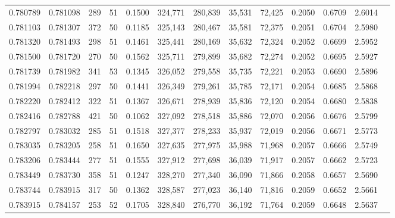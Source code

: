 \begin{tabular}{rrrrrrrrrrrrr}
0.780789 & 0.781098 &   289 &  51 &                                     0.1500 & 324,771 & 280,839 &  35,531 &  72,425 & 0.2050 & 0.6709 & 2.6014 \\
0.781103 & 0.781307 &   372 &  50 &                                     0.1185 & 325,143 & 280,467 &  35,581 &  72,375 & 0.2051 & 0.6704 & 2.5980 \\
0.781320 & 0.781493 &   298 &  51 &                                     0.1461 & 325,441 & 280,169 &  35,632 &  72,324 & 0.2052 & 0.6699 & 2.5952 \\
0.781500 & 0.781720 &   270 &  50 &                                     0.1562 & 325,711 & 279,899 &  35,682 &  72,274 & 0.2052 & 0.6695 & 2.5927 \\
0.781739 & 0.781982 &   341 &  53 &                                     0.1345 & 326,052 & 279,558 &  35,735 &  72,221 & 0.2053 & 0.6690 & 2.5896 \\
0.781994 & 0.782218 &   297 &  50 &                                     0.1441 & 326,349 & 279,261 &  35,785 &  72,171 & 0.2054 & 0.6685 & 2.5868 \\
0.782220 & 0.782412 &   322 &  51 &                                     0.1367 & 326,671 & 278,939 &  35,836 &  72,120 & 0.2054 & 0.6680 & 2.5838 \\
0.782416 & 0.782788 &   421 &  50 &                                     0.1062 & 327,092 & 278,518 &  35,886 &  72,070 & 0.2056 & 0.6676 & 2.5799 \\
0.782797 & 0.783032 &   285 &  51 &                                     0.1518 & 327,377 & 278,233 &  35,937 &  72,019 & 0.2056 & 0.6671 & 2.5773 \\
0.783035 & 0.783205 &   258 &  51 &                                     0.1650 & 327,635 & 277,975 &  35,988 &  71,968 & 0.2057 & 0.6666 & 2.5749 \\
0.783206 & 0.783444 &   277 &  51 &                                     0.1555 & 327,912 & 277,698 &  36,039 &  71,917 & 0.2057 & 0.6662 & 2.5723 \\
0.783449 & 0.783730 &   358 &  51 &                                     0.1247 & 328,270 & 277,340 &  36,090 &  71,866 & 0.2058 & 0.6657 & 2.5690 \\
0.783744 & 0.783915 &   317 &  50 &                                     0.1362 & 328,587 & 277,023 &  36,140 &  71,816 & 0.2059 & 0.6652 & 2.5661 \\
0.783915 & 0.784157 &   253 &  52 &                                     0.1705 & 328,840 & 276,770 &  36,192 &  71,764 & 0.2059 & 0.6648 & 2.5637 \\

\end{tabular}
